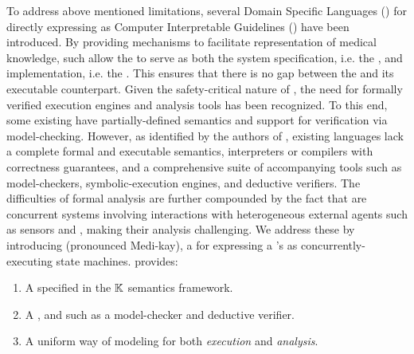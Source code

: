 To address above mentioned limitations, several Domain Specific Languages
(\DSLs{}) for directly expressing \BPGLogic{} as Computer Interpretable
Guidelines (\CIGs{}) have been introduced. By providing mechanisms to facilitate
representation of medical knowledge, such \DSLs{} allow the \CIG{} to serve
as both the system specification, i.e. the \BPG{}, and implementation, i.e. the
\BPGLogic{}. This ensures that there is no gap between the \BPG{} and
its executable counterpart.
Given the safety-critical nature of \CDSSs{}, the need for formally verified
execution engines and analysis tools has been recognized.
To this end, some existing \DSLs{} have partially-defined semantics and
support for verification via model-checking.
However, as identified by the authors of \cite{SuttonAMIA03, ShaharAMIA96},
existing languages lack a complete formal and executable semantics,
interpreters or compilers with correctness guarantees,
and a comprehensive suite of accompanying tools such as model-checkers, symbolic-execution
engines, and deductive verifiers. The difficulties of formal analysis are further compounded
by the fact that \CDSSs{} are concurrent systems involving interactions with
heterogeneous external agents such as sensors and
\HCPs{}, making their analysis challenging.
We address these by introducing \MediK{} (pronounced Medi-kay),
a \DSL{} for expressing a \CDSS{}'s \BPGLogic{} as concurrently-executing state machines. \MediK{}
provides:
\begin{enumerate}
  \item A  specified in the $\mathbb{K}{}$
  semantics framework.
  \item A , and  such as a model-checker and deductive verifier.
  \item A uniform way of modeling  for both
  \emph{execution} and \emph{analysis}.
\end{enumerate}
